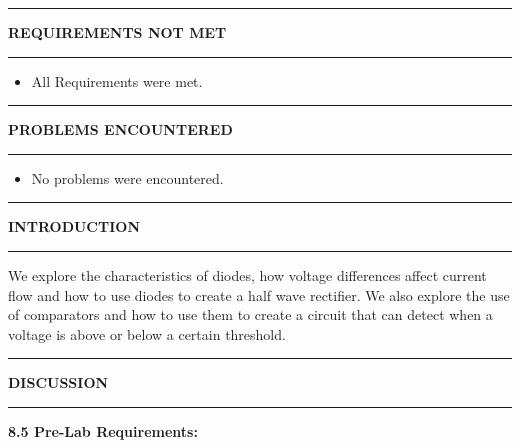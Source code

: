 \documentclass{article}
\begin{document}

\begin{center}
    \hrule
    \vspace{0.2cm}
    \textbf{\large REQUIREMENTS NOT MET}
    \vspace{0.2cm}
    \hrule
\end{center}
\begin{itemize}
    \item All Requirements were met.
\end{itemize}

\begin{center}
    \hrule
    \vspace{0.2cm}
    \textbf{\large PROBLEMS ENCOUNTERED}
    \vspace{0.2cm}
    \hrule
\end{center}
\begin{itemize}
    \item No problems were encountered.
\end{itemize}

\begin{center}
    \hrule
    \vspace{0.2cm}
    \textbf{\large INTRODUCTION}
    \vspace{0.2cm}
    \hrule
\end{center}

We explore the characteristics of diodes, how voltage differences affect current flow and how to use diodes to create a half wave rectifier. We also explore the use of comparators and how to use them to create a circuit that can detect when a voltage is above or below a certain threshold.

\begin{center}
    \hrule
    \vspace{0.2cm}
    \textbf{\large DISCUSSION}
    \vspace{0.2cm}
    \hrule
\end{center}

\textbf{\large8.5 Pre-Lab Requirements:}
\end{document}
